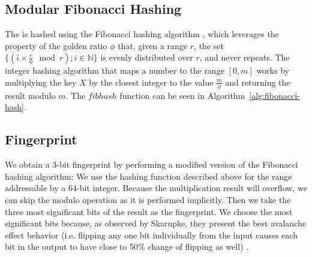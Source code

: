 \subsection{Modular Fibonacci Hashing}\label{sec:fibhash}


The \kmer is hashed using the Fibonacci hashing algorithm \cite{Skarupke2018}, which leverages the property of the golden ratio $\phi$ that, given a range $r$, the set $\{(i \times \frac{r}{\phi} \mod r) ; i \in \mathbb{N}\}$ is evenly distributed over $r$, and never repeats. The integer hashing algorithm that maps a number to the range $[0, m]$ works by multiplying the key $X$ by the closest integer to the value $\frac{m}{\phi}$ and returning the result modulo $m$. The $\mathit{fibhash}$ function can be seen in Algorithm~\ref{alg:fibonacci-hash}.

\begin{algorithm}
  \caption{$\mathit{fibhash}(X, m)$}\label{alg:fibonacci-hash}
\end{algorithm}

\subsection{Fingerprint}\label{sec:fingerprint}

We obtain a 3-bit fingerprint by performing a modified version of the Fibonacci hashing algorithm: We use the hashing function described above for the range addressable by a 64-bit integer. Because the multiplication result will overflow, we can skip the modulo operation as it is performed implicitly. Then we take the three most significant bits of the result as the fingerprint. We choose the most significant bits because, as observed by Skarupke, they present the best avalanche effect behavior (i.e. flipping any one bit individually from the input causes each bit in the output to have close to 50\% change of flipping as well) \cite{Skarupke2018}.

